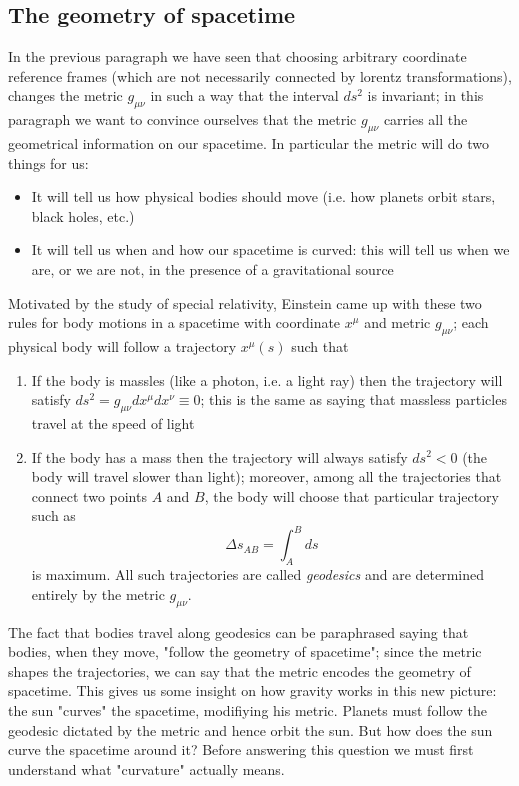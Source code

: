 \subsection{The geometry of spacetime}
In the previous paragraph we have seen that choosing arbitrary coordinate reference frames (which are not necessarily connected by lorentz transformations), changes the metric $g_{\mu\nu}$ in such a way that the interval $ds^2$ is invariant; in this paragraph we want to convince ourselves that the metric $g_{\mu\nu}$ carries all the geometrical information on our spacetime. In particular the metric will do two things for us: 
\begin{itemize}
\item It will tell us how physical bodies should move (i.e. how planets orbit stars, black holes, etc.)
\item It will tell us when and how our spacetime is curved: this will tell us when we are, or we are not, in the presence of a gravitational source
\end{itemize}
Motivated by the study of special relativity, Einstein came up with these two rules for body motions in a spacetime with coordinate $x^{\mu}$ and metric $g_{\mu\nu}$; each physical body will follow a trajectory $x^{\mu}(s)$ such that 
\begin{enumerate}
\item If the body is massles (like a photon, i.e. a light ray) then the trajectory will satisfy $ds^2=g_{\mu\nu}dx^{\mu}dx^{\nu}\equiv 0$; this is the same as saying that massless particles travel at the speed of light
\item If the body has a mass then the trajectory will always satisfy $ds^2<0$ (the body will travel slower than light); moreover, among all the trajectories that connect two points $A$ and $B$, the body will choose that particular trajectory such as 
\begin{equation}
\Delta s_{AB}=\int_A^Bds
\end{equation}
is maximum. All such trajectories are called \textit{geodesics} and are determined entirely by the metric $g_{\mu\nu}$.
\end{enumerate}
The fact that bodies travel along geodesics can be paraphrased saying that bodies, when they move, "follow the geometry of spacetime"; since the metric shapes the trajectories, we can say that the metric encodes the geometry of spacetime. This gives us some insight on how gravity works in this new picture: the sun "curves" the spacetime, modifiying his metric. Planets must follow the geodesic dictated by the metric and hence orbit the sun. But how does the sun curve the spacetime around it? Before answering this question we must first understand what "curvature" actually means. 
